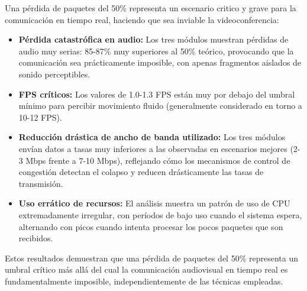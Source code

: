 Una pérdida de paquetes del 50\% representa un escenario critico y grave para la comunicación en tiempo real, haciendo que sea inviable la videoconferencia:

\begin{itemize}
    \item \textbf{Pérdida catastrófica en audio:} Los tres módulos muestran pérdidas de audio muy serias: 85-87\% muy superiores al 50\% teórico, provocando que la comunicación sea prácticamente imposible, con apenas fragmentos aislados de sonido perceptibles.
    
    \item \textbf{FPS críticos:} Los valores de 1.0-1.3 FPS están muy por debajo del umbral mínimo para percibir movimiento fluido (generalmente considerado en torno a 10-12 FPS).
    
    \item \textbf{Reducción drástica de ancho de banda utilizado:} Los tres módulos envían datos a tasas muy inferiores a las observadas en escenarios mejores (2-3 Mbps frente a 7-10 Mbps), reflejando cómo los mecanismos de control de congestión detectan el colapso y reducen drásticamente las tasas de transmisión.
    
    \item \textbf{Uso errático de recursos:} El análisis muestra un patrón de uso de CPU extremadamente irregular, con períodos de bajo uso cuando el sistema espera, alternando con picos cuando intenta procesar los pocos paquetes que son recibidos.

\end{itemize}

Estos resultados demuestran que una pérdida de paquetes del 50\% representa un umbral crítico más allá del cual la comunicación audiovisual en tiempo real es fundamentalmente imposible, independientemente de las técnicas empleadas.